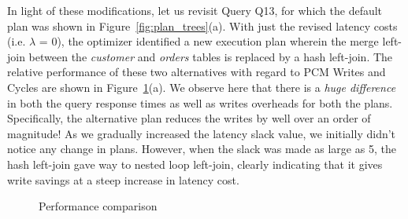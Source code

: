 In light of these modifications, let us revisit Query Q13, for which
the default plan was shown in Figure~\ref{fig:plan_trees}(a). With
just the revised latency costs (i.e. $\lambda$ = 0), the optimizer
identified a new execution plan wherein the merge left-join between the
\textit{customer} and \textit{orders} tables is replaced by a hash left-join.  The relative performance of these two alternatives with regard to
PCM Writes and Cycles are shown in Figure~\ref{fig:perf_comp}(a). We observe here that there is a \emph{huge difference}
in both the query response times as well as writes overheads for both
the plans.  Specifically, the alternative plan reduces the writes by
well over an order of magnitude!  As we gradually increased the latency
slack value, we initially didn't notice any change in plans. However,
when the slack was made as large as 5, the hash left-join gave way to
nested loop left-join, clearly indicating that it gives write savings
at a steep increase in latency cost.


\begin{figure}[htbp]
\centering
	

\caption{Performance comparison}
\label{fig:perf_comp}
\end{figure}



